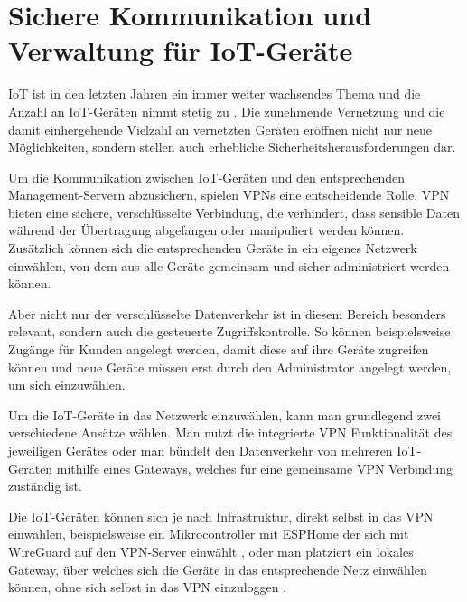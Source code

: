 \section{Sichere Kommunikation und Verwaltung für \gls{IoT}-Geräte} \label{iot}

\gls{IoT} ist in den letzten Jahren ein immer weiter wachsendes Thema und die Anzahl an \gls{IoT}-Geräten nimmt stetig zu \cite{Statista_IoT_Devices_2030}. Die zunehmende Vernetzung und die damit einhergehende Vielzahl an vernetzten Geräten eröffnen nicht nur neue Möglichkeiten, sondern stellen auch erhebliche Sicherheitsherausforderungen dar.

Um die Kommunikation zwischen \gls{IoT}-Geräten und den entsprechenden Management-Servern abzusichern, spielen \gls{VPN}s eine entscheidende Rolle. \gls{VPN} bieten eine sichere, verschlüsselte Verbindung, die verhindert, dass sensible Daten während der Übertragung abgefangen oder manipuliert werden können. Zusätzlich können sich die entsprechenden Geräte in ein eigenes Netzwerk einwählen, von dem aus alle Geräte gemeinsam und sicher administriert werden können. 

Aber nicht nur der verschlüsselte Datenverkehr ist in diesem Bereich besonders relevant, sondern auch die gesteuerte Zugriffskontrolle. So können beispielsweise Zugänge für Kunden angelegt werden, damit diese auf ihre Geräte zugreifen können und neue Geräte müssen erst durch den Administrator angelegt werden, um sich einzuwählen.

Um die \gls{IoT}-Geräte in das Netzwerk einzuwählen, kann man grundlegend zwei verschiedene Ansätze wählen. Man nutzt die integrierte \gls{VPN} Funktionalität des jeweiligen Gerätes oder man bündelt den Datenverkehr von mehreren \gls{IoT}-Geräten mithilfe eines Gateways, welches für eine gemeinsame \gls{VPN} Verbindung zuständig ist.

Die \gls{IoT}-Geräten können sich je nach Infrastruktur, direkt selbst in das \gls{VPN} einwählen, beispielsweise ein Mikrocontroller mit ESPHome der sich mit WireGuard auf den \gls{VPN}-Server einwählt \cite{ESPHome_Wireguard}, oder man platziert ein lokales Gateway, über welches sich die Geräte in das entsprechende Netz einwählen können, ohne sich selbst in das \gls{VPN} einzuloggen \cite{IoT_OpenVPN_Raspberry}.